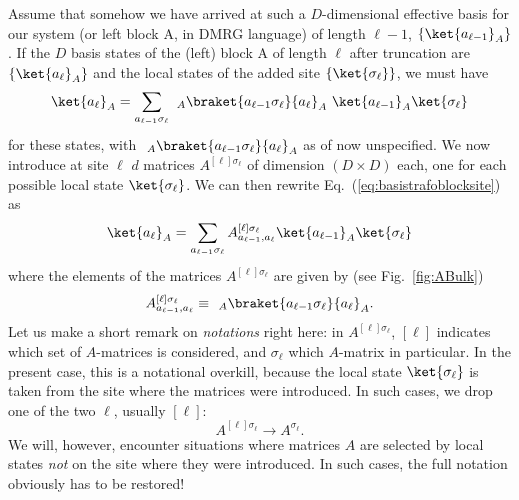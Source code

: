 Assume that somehow we have arrived at such a $D$-dimensional effective basis for our system (or left block A, in DMRG language) of length $\ell-1$, $\{ \ket{a_{\ell-1}}_A \}$. If the $D$ basis states of the (left) block A of length $\ell$ after truncation are $\{ \ket{a_{\ell}}_A \}$ and the local states of the added site  $\{ \ket{\sigma_\ell} \}$, we must have
\begin{equation}
\ket{a_\ell}_A = \sum_{a_{\ell-1}\sigma_\ell} \phantom\langle _A \braket{a_{\ell-1}\sigma_\ell}{a_\ell}_A \,\, \ket{a_{\ell-1}}_A\ket{\sigma_\ell}
\label{eq:basistrafoblocksite}
\end{equation}
for these states, with $\phantom\langle _A \braket{a_{\ell-1}\sigma_\ell}{a_\ell}_A$ as of now unspecified. We now introduce at site $\ell$ $d$ matrices $A^{[\ell]\sigma_\ell}$  of dimension $(D \times D)$ each, one for each possible local state $\ket{\sigma_\ell}$. We can then rewrite Eq.~(\ref{eq:basistrafoblocksite}) as
\begin{equation}
\ket{a_\ell}_A = \sum_{a_{\ell-1}\sigma_\ell} A^{[\ell]\sigma_\ell}_{a_{\ell-1}, a_\ell} \ket{a_{\ell-1}}_A  \ket{\sigma_\ell} 
\label{eq:matrixbyRG}
\end{equation}
where the elements of the matrices $A^{[\ell]\sigma_\ell}$ are given by (see Fig.~\ref{fig:ABulk})
\begin{equation}
A^{[\ell]\sigma_\ell}_{a_{\ell-1}, a_\ell} \equiv \phantom\langle_A \braket{a_{\ell-1}\sigma_\ell}{a_\ell}_A. 
\label{eq:Amatrixelements}
\end{equation}
Let us make a short remark on {\em notations} right here: in $A^{[\ell]\sigma_\ell}$, $[\ell]$ indicates which  set of $A$-matrices is considered, and $\sigma_\ell$ which $A$-matrix in particular. In the present case, this is a notational overkill, because the local state $\ket{\sigma_\ell}$ is taken from the site where the matrices were introduced. In such cases, we drop one of the two $\ell$, usually $[\ell]$:
\begin{equation}
A^{[\ell]\sigma_\ell} \rightarrow A^{\sigma_\ell} .
\end{equation}
We will, however, encounter situations where matrices $A$ are selected by local states {\em not} on the site where they were introduced. In such cases, the full notation obviously has to be restored! 

